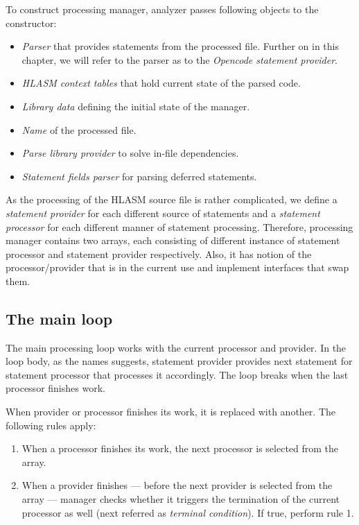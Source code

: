To construct processing manager, analyzer passes following objects to the constructor:
\begin{itemize}
	\item \emph{Parser} that provides statements from the processed file. Further on in this chapter, we will refer to the parser as to the \emph{Opencode statement provider}.
	\item \emph{HLASM context tables} that hold current state of the parsed code.
	\item \emph{Library data} defining the initial state of the manager.
	\item \emph{Name} of the processed file.
	\item \emph{Parse library provider} to solve in-file dependencies.
	\item \emph{Statement fields parser} for parsing deferred statements. 
\end{itemize}

As the processing of the HLASM source file is rather complicated, we define a \emph{statement provider} for each different source of statements and a \emph{statement processor} for each different manner of statement processing. Therefore, processing manager contains two arrays, each consisting of different instance of statement processor and statement provider respectively.  Also, it has notion of the processor/provider that is in the current use and implement interfaces that swap them.

\subsection{The main loop}

The main processing loop works with the current processor and provider. In the loop body, as the names suggests, statement provider provides next statement for statement processor that processes it accordingly. The loop breaks when the last processor finishes work.

When provider or processor finishes its work, it is replaced with another. The following rules apply:

\begin{enumerate}
	\item When a processor finishes its work, the next processor is selected from the array.
	\item When a provider finishes --- before the next provider is selected from the array --- manager checks whether it triggers the termination of the current processor as well (next referred as \emph{terminal condition}). If true, perform rule 1.
\end{enumerate}

